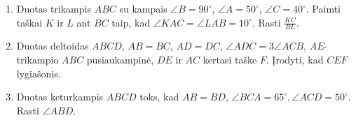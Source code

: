 \begin{enumerate}
\item Duotas trikampis $ABC$ su kampais $\angle B=90^\circ$,
  $\angle A=50^\circ$, $\angle C=40^\circ$. Paimti taškai
  $K$ ir $L$ ant $BC$ taip, kad $\angle KAC=\angle
  LAB=10^\circ$. Rasti $\frac{KC}{BL}$.
\item Duotas deltoidas $ABCD$, $AB=BC$, $AD=DC$, $\angle
  ADC=3\angle ACB$, $AE$-trikampio $ABC$ pusiaukampinė, $DE$
  ir $AC$ kertasi taške $F$. Įrodyti, kad $CEF$ lygiašonis.
\item Duotas keturkampis $ABCD$ toks, kad $AB=BD$, $\angle 
  BCA=65^\circ, \angle ACD=50^\circ$. Rasti $\angle ABD$.
  

\end{enumerate}
